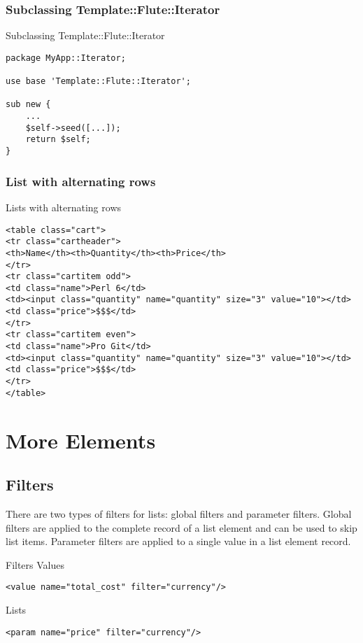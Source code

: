 \subsubsection{Subclassing Template::Flute::Iterator}
\begin{frame}[fragile]{Subclassing Template::Flute::Iterator}
\begin{lstlisting}
package MyApp::Iterator;

use base 'Template::Flute::Iterator';

sub new {
    ...
    $self->seed([...]);
    return $self;
}
\end{lstlisting}
\end{frame}

\subsubsection{List with alternating rows}
\begin{frame}[fragile]{Lists with alternating rows}
\begin{lstlisting}
<table class="cart">
<tr class="cartheader">
<th>Name</th><th>Quantity</th><th>Price</th>
</tr>
<tr class="cartitem odd">
<td class="name">Perl 6</td>
<td><input class="quantity" name="quantity" size="3" value="10"></td>
<td class="price">$$$</td>
</tr>
<tr class="cartitem even">
<td class="name">Pro Git</td>
<td><input class="quantity" name="quantity" size="3" value="10"></td>
<td class="price">$$$</td>
</tr>
</table>
\end{lstlisting}
\end{frame}

\section{More Elements}
\subsection{Filters}
There are two types of filters for lists: global filters and
parameter filters. Global filters are applied to the complete
record of a list element and can be used to skip list items.
Parameter filters are applied to a single value in a list
element record.

\begin{frame}[fragile]{Filters}
Values
\begin{lstlisting}
<value name="total_cost" filter="currency"/>
\end{lstlisting}
Lists
\begin{lstlisting}
<param name="price" filter="currency"/>
\end{lstlisting}

\end{frame}

